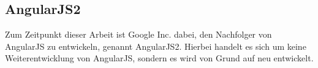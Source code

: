 \subsection{AngularJS2}
\label{sec:angularjs2}

Zum Zeitpunkt dieser Arbeit ist Google Inc. dabei, den Nachfolger von AngularJS zu entwickeln, genannt AngularJS2. Hierbei handelt es sich um keine Weiterentwicklung von AngularJS, sondern es wird von Grund auf neu entwickelt.










